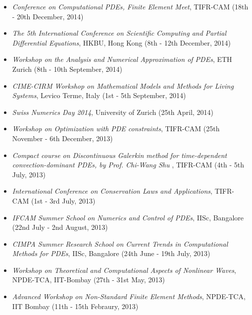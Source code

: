 \documentclass[margin]{res}
\begin{document}
\begin{resume}
\begin{itemize}
               \item {\it Conference on Computational PDEs, Finite Element Meet}, TIFR-CAM (18th - 20th December, 2014) 
               
               \item{\it The 5th International Conference on Scientific Computing and Partial Differential Equations}, HKBU, Hong Kong (8th - 12th December, 2014)
               
               \item{\it Workshop on the Analysis and Numerical Approximation of PDEs}, ETH Zurich (8th - 10th September, 2014)
               
               \item{\it CIME-CIRM Workshop on Mathematical Models and Methods for Living Systems}, Levico Terme, Italy (1st - 5th September, 2014)

               \item {\it Swiss Numerics Day 2014}, University of Zurich (25th April, 2014)
               
   
               \item{\it Workshop on Optimization with PDE constraints}, TIFR-CAM (25th November - 6th December, 2013)
   
               
               \item{\it Compact course on Discontinuous Galerkin method for time-dependent convection-dominant PDEs, by Prof. Chi-Wang Shu }, TIFR-CAM (4th - 5th July, 2013)
               
               
               \item{\it International Conference on Conservation Laws and Applications}, TIFR-CAM (1st - 3rd July, 2013)
               
               \item{\it IFCAM Summer School on Numerics and Control of PDEs}, IISc, Bangalore (22nd July - 2nd August, 2013)
               
               \item{\it CIMPA Summer Research School on Current Trends in Computational Methods for PDEs}, IISc, Bangalore (24th June - 19th July, 2013)
               
               \item{\it Workshop on Theoretical and Computational Aspects of Nonlinear Waves}, \\NPDE-TCA, IIT-Bombay (27th - 31st May, 2013)

               \item{\it Advanced Workshop on Non-Standard Finite Element Methods}, NPDE-TCA, \\IIT Bombay (11th - 15th Febraury, 2013)


\end{itemize}
\end{resume}
\end{document}
